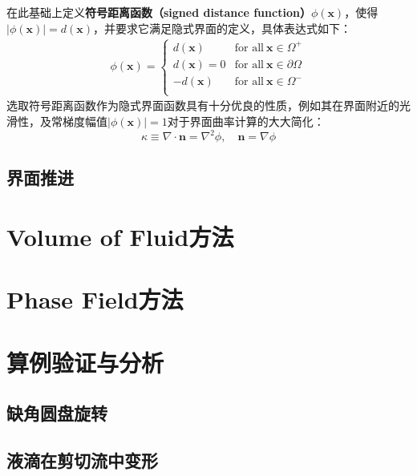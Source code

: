\documentclass[10pt]{article}
\begin{document}
在此基础上定义\textbf{符号距离函数（signed distance function）}$\phi(\bm{x})$，使得$|\phi(\bm{x})|=d(\bm{x})$，并要求它满足隐式界面的定义，具体表达式如下：
\begin{eqnarray}
    \phi(\bm{x})=\left\{\begin{array}{rl}
        d(\bm{x})   & \text{for all}\ \bm{x}\in\Omega^+       \\
        d(\bm{x})=0 & \text{for all}\ \bm{x}\in\partial\Omega \\
        -d(\bm{x})  & \text{for all}\ \bm{x}\in\Omega^-       \\
    \end{array}\right.
    \label{eqn:sdf}
\end{eqnarray}
选取符号距离函数作为隐式界面函数具有十分优良的性质，例如其在界面附近的光滑性，及常梯度幅值$\left|\phi(\bm{x})\right|=1$对于界面曲率计算的大大简化：
\begin{equation}
    \kappa\equiv\nabla\cdot\bm{n}=\nabla^2\phi,\quad \bm{n}=\nabla\phi
\end{equation}

\subsection{界面推进}

\newpage
\section{Volume of Fluid方法}

\newpage
\section{Phase Field方法}

\newpage
\section{算例验证与分析}
\subsection{缺角圆盘旋转}

\subsection{液滴在剪切流中变形}



\end{document}
